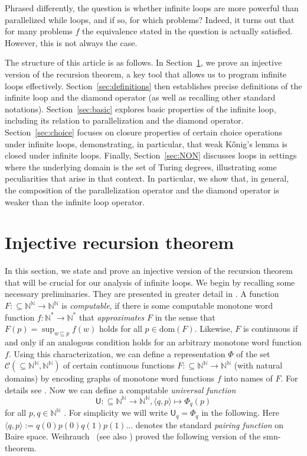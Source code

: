 \documentclass[11pt,a4paper]{amsart}
\theoremstyle{plain}
\theoremstyle{definition}
\theoremstyle{defC}
\theoremstyle{thmC}
\theoremstyle{plain}
\numberwithin{equation}{section}
\def\CC{{\mathcal C}}
\def\IN{{\mathbb{N}}}
\def\In{\subseteq}
\def\prefix{\sqsubseteq}
\def\U{{\mathsf{{U}}}}
\def\dom{{\mathrm{dom}}}
\begin{document}
\noindent
Phrased differently, the question is whether infinite loops are more powerful than parallelized while loops,
and if so, for which problems?
Indeed, it turns out that for many problems $f$ the equivalence stated in the question is actually satisfied.
However, this is not always the case.

The structure of this article is as follows. 
In Section~\ref{sec:recursion}, we prove an injective version of the recursion theorem, a key tool that allows us to program infinite loops effectively. 
Section~\ref{sec:definitions} then establishes precise definitions of the infinite loop and the diamond operator (as well as recalling other standard notations). Section~\ref{sec:basic} explores basic properties of the infinite loop, including its relation to parallelization and the diamond operator. Section~\ref{sec:choice} focuses on closure properties of certain choice operations under infinite loops, demonstrating, in particular, that weak K\H{o}nig's lemma is closed under infinite loops. Finally, Section~\ref{sec:NON} discusses loops in settings where the underlying domain is the set of Turing degrees, illustrating some peculiarities that arise in that context. In particular, we show that, in general, the composition of the parallelization operator
and the diamond operator is weaker than the infinite loop operator.



\section{Injective recursion theorem}
\label{sec:recursion}

In this section, we state and prove an injective version of the recursion theorem that will be crucial for our analysis of infinite loops. We begin by recalling some necessary preliminaries. They 
are presented in greater detail in \cite{Bra23}.
A function $F:\In\IN^\IN\to\IN^\IN$ is {\em computable}, if there is some computable monotone word function 
${f:\IN^*\to\IN^*}$
that {\em approximates} $F$ in the sense that $F(p)=\sup_{w\prefix p}f(w)$ holds for all $p\in\dom(F)$. 
Likewise, $F$ is continuous if and only if an analogous condition holds for an arbitrary monotone word function $f$.
Using this characterization, we can define a representation $\Phi$ of the set $\CC(\In\IN^\IN,\IN^\IN)$ of certain continuous functions 
$F:\In\IN^\IN\to\IN^\IN$ (with natural domains) by encoding graphs of monotone word functions $f$ into names of $F$. 
For details see \cite{Wei87}.
Now we can define a computable {\em universal function} 
\[\U:\In\IN^\IN\to\IN^\IN,\langle q,p\rangle\mapsto\Phi_q(p)\] 
for all $p,q\in\IN^\IN$ \cite[Theorem~3.2.16~(1)]{Wei87}. 
For simplicity we will write $\U_q=\Phi_q$ in the following.
Here $\langle q,p\rangle:=q(0)p(0)q(1)p(1)...$ denotes the standard {\em pairing function} on Baire space.
Weihrauch~\cite[Theorems~3.5, 2.10, Corollary~2.11]{Wei85} (see also \cite[Theorem~3.2.16]{Wei87}) proved the following version of the smn-theorem.
\end{document}
